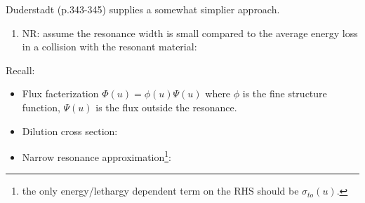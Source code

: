 \documentclass{school-22.211-notes}
\begin{document}
Duderstadt (p.343-345) supplies a somewhat simplier approach. 
\begin{enumerate}
\item NR: assume the resonance width is small compared to the average energy loss in a collision with the resonant material: 


\end{enumerate}





\clearpage
{}
Recall:
\begin{itemize}
\item Flux facterization $\Phi(u) = \phi(u) \Psi(u)$ where $\phi$ is the fine structure function, $\Psi(u)$ is the flux outside the resonance. 
\item Dilution cross section: 
\item Narrow resonance approximation\footnote{the only energy/lethargy dependent term on the RHS should be $\sigma_{to}(u)$.}:
\end{itemize}
\end{document}
